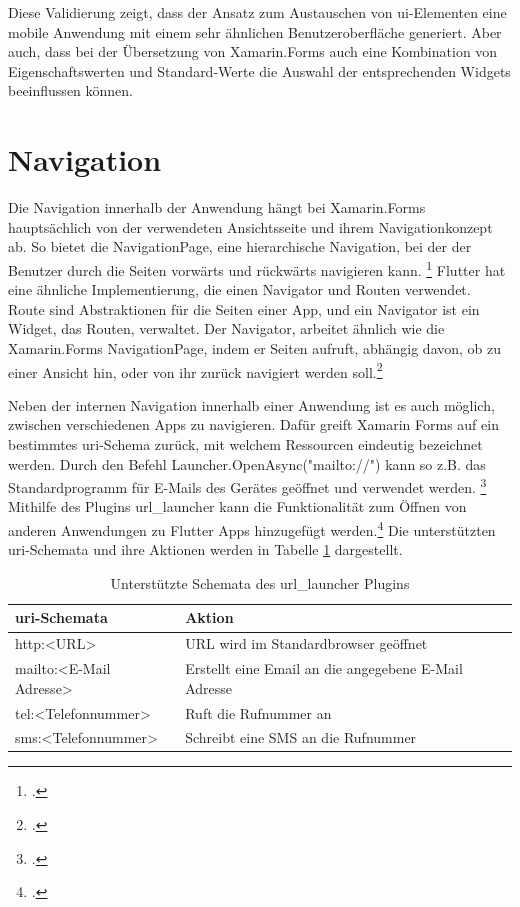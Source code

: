 Diese Validierung zeigt,  dass der Ansatz zum Austauschen von \ac{ui}-Elementen eine mobile Anwendung mit einem sehr ähnlichen Benutzeroberfläche generiert.  Aber auch,  dass bei der Übersetzung von Xamarin.Forms auch eine Kombination von Eigenschaftswerten und Standard-Werte die Auswahl der entsprechenden Widgets beeinflussen können.

\section{Navigation}
\label{sec:nav}

Die Navigation innerhalb der Anwendung hängt bei Xamarin.Forms hauptsächlich von der verwendeten Ansichtsseite und ihrem Navigationkonzept ab.  So bietet die \glq NavigationPage\grq{}, eine hierarchische Navigation, bei der der Benutzer durch die Seiten vorwärts und rückwärts navigieren kann. \footcite[Vgl.][Abgerufen am \today]{MicrosoftXamNavigation2020} Flutter hat eine ähnliche Implementierung,  die einen \glq  Navigator\grq{} und \glq  Routen\grq{} verwendet.  Route sind  Abstraktionen für die Seiten einer App, und ein \glq  Navigator\grq{} ist ein Widget, das \glq Routen\grq{}, verwaltet.  Der \glq Navigator\grq{}, arbeitet ähnlich wie die Xamarin.Forms \glq NavigationPage\grq{}, indem er Seiten aufruft,  abhängig davon,  ob zu einer Ansicht hin,  oder von ihr zurück navigiert werden soll.\footcite[Vgl.][Abgerufen am \today]{GoogleFlutterNavigation2020} 


Neben der internen Navigation innerhalb einer Anwendung ist es auch möglich, zwischen verschiedenen Apps zu navigieren.  Dafür greift Xamarin Forms auf ein bestimmtes \ac{uri}-Schema zurück, mit welchem Ressourcen eindeutig bezeichnet werden.  Durch den Befehl \glq Launcher.OpenAsync("mailto://")\grq{} kann so z.B.  das Standardprogramm für E-Mails des Gerätes geöffnet und verwendet werden. \footcite[Vgl.][Abgerufen am \today]{MicrosoftLauncher2020} Mithilfe des Plugins \glq url\_launcher\grq{} kann die Funktionalität zum Öffnen von anderen Anwendungen zu Flutter Apps hinzugefügt werden.\footcite[Vgl.][Abgerufen am \today]{Googleurllauncher2020} Die unterstützten \ac{uri}-Schemata und ihre Aktionen werden in Tabelle \ref{tab:URISChema} dargestellt.

\begin{table}[!ht]
\begin{tabularx}{\textwidth}{X|X}
   \textbf{\ac{uri}-Schemata} & \textbf{Aktion}  \\
\hline
	http:<URL>		       				&  	URL wird im Standardbrowser geöffnet 		\\ 
	mailto:<E-Mail Adresse>		       		&  	Erstellt eine Email an die angegebene E-Mail Adresse 		\\ 
	tel:<Telefonnummer>	       		&  	Ruft die Rufnummer an 		\\ 
	sms:<Telefonnummer>		       		&  	Schreibt eine SMS an die Rufnummer		\\ 
\end{tabularx}
\caption{Unterstützte Schemata des \glq url\_launcher\grq{} Plugins}
 \label{tab:URISChema}
\end{table}

